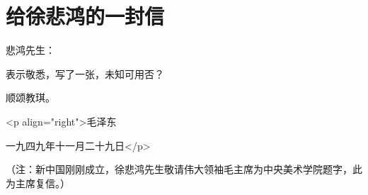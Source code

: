 \section[给徐悲鸿的一封信（一九四九年十一月二十九日）]{给徐悲鸿的一封信}


悲鸿先生：

表示敬悉，写了一张，未知可用否？

顺颂教琪。

<p align="right">毛泽东

一九四九年十一月二十九日</p>

（注：新中国刚刚成立，徐悲鸿先生敬请伟大领袖毛主席为中央美术学院题字，此为主席复信。）



